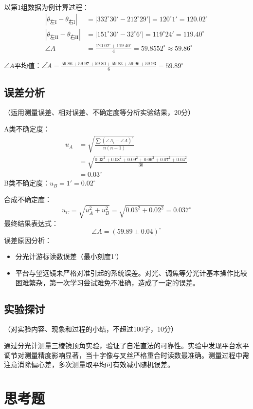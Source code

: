 \documentclass[10pt,a4paper]{ctexart}
\newcommand{\xiaosi}{\fontsize{12pt}{16pt}\selectfont}
\begin{document}
以第1组数据为例计算过程：
\begin{align*}
|\theta_{\text{左I}} - \theta_{\text{右I}}| &= |332^\circ30' - 212^\circ29'| = 120^\circ1' = 120.02^\circ \\
|\theta_{\text{左II}} - \theta_{\text{右II}}| &= |151^\circ30' - 32^\circ6'| = 119^\circ24' = 119.40^\circ \\
\angle A &= \frac{120.02^\circ + 119.40^\circ}{4} = 59.8552^\circ \approx 59.86^\circ
\end{align*}

$\angle A$平均值：$\bar {\angle A}= \frac{59.86+59.97+59.80+59.83+59.96+59.93}{6} = 59.89^\circ$
\subsection{误差分析}
    \xiaosi （运用测量误差、相对误差、不确定度等分析实验结果，20分）

    A类不确定度：
\begin{align*}
u_A &= \sqrt{\frac{\sum(\angle A_i - \bar{\angle A})^2}{n(n-1)}} \\
&= \sqrt{\frac{0.03^2+0.08^2+0.09^2+0.06^2+0.07^2+0.04^2}{30}} \\
&= 0.03^\circ
\end{align*}
B类不确定度：$u_B=1'=0.02 ^\circ$

合成不确定度：
$$ u_C = \sqrt{u_A^2 + u_B^2} = \sqrt{0.03^2 + 0.02^2} = 0.037^\circ $$
最终结果表达式：$$ \angle A = (59.89 \pm 0.04)^\circ $$
误差原因分析：
\begin{itemize}
\item 分光计游标读数误差（最小刻度1'）
\item 平台与望远镜未严格对准引起的系统误差。对光、调焦等分光计基本操作比较困难繁杂，第一次学习尝试难免不准确，造成了一定的误差。
\end{itemize}
    \subsection{实验探讨}
    \xiaosi （对实验内容、现象和过程的小结，不超过100字，10分）

    通过分光计测量三棱镜顶角实验，验证了自准直法的可靠性。实验中发现平台水平调节对测量精度影响显著，当十字像与叉丝严格重合时读数最准确。测量过程中需注意消除偏心差，多次测量取平均可有效减小随机误差。
\section{思考题}
\end{document}
